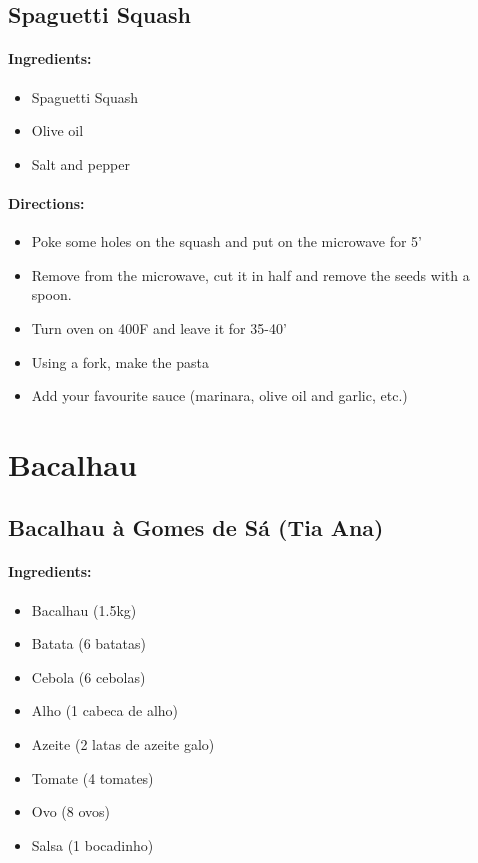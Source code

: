 \documentclass{article}
\begin{document}
\subsection{Spaguetti Squash}

\paragraph{Ingredients:}
\begin{itemize}
    \item Spaguetti Squash
    \item Olive oil
    \item Salt and pepper
\end{itemize}

\paragraph{Directions:}
\begin{itemize}
    \item Poke some holes on the squash and put on the microwave for 5'
    \item Remove from the microwave, cut it in half and remove the seeds with a spoon.
    \item Turn oven on 400F and leave it for 35-40'
    \item Using a fork, make the pasta
    \item Add your favourite sauce (marinara, olive oil and garlic, etc.)
\end{itemize}

\section{Bacalhau}


\subsection{Bacalhau à Gomes de Sá (Tia Ana)}

\paragraph{Ingredients:}
\begin{itemize}
    \item Bacalhau (1.5kg)
    \item Batata (6 batatas)
    \item Cebola (6 cebolas)
    \item Alho (1 cabeca de alho)
    \item Azeite (2 latas de azeite galo)
    \item Tomate (4 tomates)
    \item Ovo (8 ovos)
    \item Salsa (1 bocadinho)
\end{itemize}
\end{document}

